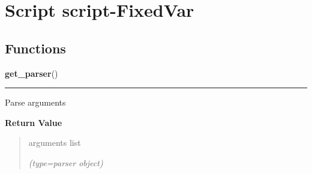 %
%
%


\section{Script script-FixedVar}

    \label{script-FixedVar}


  \subsection{Functions}

    \label{script-FixedVar:get_parser}

    \vspace{0.5ex}

\hspace{.8\funcindent}\begin{boxedminipage}{\funcwidth}

    \raggedright \textbf{get\_parser}()

    \vspace{-1.5ex}

    \rule{\textwidth}{0.5\fboxrule}
\setlength{\parskip}{2ex}
    Parse arguments

\setlength{\parskip}{1ex}
      \textbf{Return Value}
    \vspace{-1ex}

      \begin{quote}
      arguments list

      {\it (type=parser object)}

      \end{quote}

    \end{boxedminipage}

    \label{script-FixedVar:printObjNucl}

